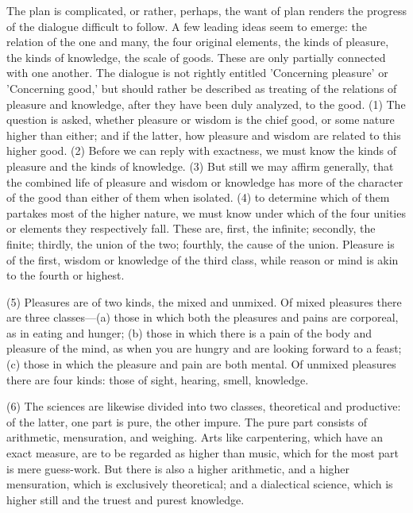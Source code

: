 \documentclass[11pt,letter]{article}
\begin{document}
\par  The plan is complicated, or rather, perhaps, the want of plan renders the progress of the dialogue difficult to follow. A few leading ideas seem to emerge: the relation of the one and many, the four original elements, the kinds of pleasure, the kinds of knowledge, the scale of goods. These are only partially connected with one another. The dialogue is not rightly entitled 'Concerning pleasure' or 'Concerning good,' but should rather be described as treating of the relations of pleasure and knowledge, after they have been duly analyzed, to the good. (1) The question is asked, whether pleasure or wisdom is the chief good, or some nature higher than either; and if the latter, how pleasure and wisdom are related to this higher good. (2) Before we can reply with exactness, we must know the kinds of pleasure and the kinds of knowledge. (3) But still we may affirm generally, that the combined life of pleasure and wisdom or knowledge has more of the character of the good than either of them when isolated. (4) to determine which of them partakes most of the higher nature, we must know under which of the four unities or elements they respectively fall. These are, first, the infinite; secondly, the finite; thirdly, the union of the two; fourthly, the cause of the union. Pleasure is of the first, wisdom or knowledge of the third class, while reason or mind is akin to the fourth or highest.

\par  (5) Pleasures are of two kinds, the mixed and unmixed. Of mixed pleasures there are three classes—(a) those in which both the pleasures and pains are corporeal, as in eating and hunger; (b) those in which there is a pain of the body and pleasure of the mind, as when you are hungry and are looking forward to a feast; (c) those in which the pleasure and pain are both mental. Of unmixed pleasures there are four kinds: those of sight, hearing, smell, knowledge.

\par  (6) The sciences are likewise divided into two classes, theoretical and productive: of the latter, one part is pure, the other impure. The pure part consists of arithmetic, mensuration, and weighing. Arts like carpentering, which have an exact measure, are to be regarded as higher than music, which for the most part is mere guess-work. But there is also a higher arithmetic, and a higher mensuration, which is exclusively theoretical; and a dialectical science, which is higher still and the truest and purest knowledge.
\end{document}
